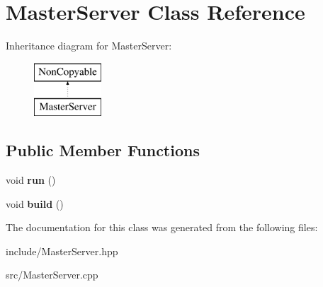 \hypertarget{class_master_server}{\section{Master\-Server Class Reference}
\label{class_master_server}
}
Inheritance diagram for Master\-Server\-:\begin{figure}[H]
\begin{center}
\leavevmode
\includegraphics[height=2.000000cm]{class_master_server}
\end{center}
\end{figure}
\subsection*{Public Member Functions}
\begin{DoxyCompactItemize}
\item 
\hypertarget{class_master_server_a139dfe6cb90deb161e607aa982a8a801}{void {\bfseries run} ()}\label{class_master_server_a139dfe6cb90deb161e607aa982a8a801}

\item 
\hypertarget{class_master_server_aa26fde6f9d9ae3a1f7041175450532fa}{void {\bfseries build} ()}\label{class_master_server_aa26fde6f9d9ae3a1f7041175450532fa}

\end{DoxyCompactItemize}


The documentation for this class was generated from the following files\-:\begin{DoxyCompactItemize}
\item 
include/Master\-Server.\-hpp\item 
src/Master\-Server.\-cpp\end{DoxyCompactItemize}
